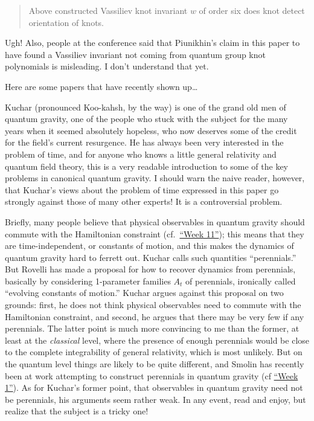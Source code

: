 \documentclass{article}
\def\tightlist{}
\renewcommand{\texttt}[1]{%
  \begingroup
  \ttfamily
  \begingroup\lccode`~=`/\lowercase{\endgroup\def~}{/\discretionary{}{}{}}%
  \begingroup\lccode`~=`[\lowercase{\endgroup\def~}{[\discretionary{}{}{}}%
  \begingroup\lccode`~=`.\lowercase{\endgroup\def~}{.\discretionary{}{}{}}%
  \catcode`/=\active\catcode`[=\active\catcode`.=\active
  \scantokens{#1\noexpand}%
  \endgroup
}
\begin{document}
\begin{quote}
Above constructed Vassiliev knot invariant \(w\) of order six does knot
detect orientation of knots.
\end{quote}
\noindent
Ugh! Also, people at the conference said that Piunikhin's claim in this
paper to have found a Vassiliev invariant not coming from quantum group
knot polynomials is misleading. I don't understand that yet.

Here are some papers that have recently shown up\ldots{}

\noindent
Kuchar (pronounced Koo-kahsh, by the way) is one of the grand old men of
quantum gravity, one of the people who stuck with the subject for the
many years when it seemed absolutely hopeless, who now deserves some of
the credit for the field's current resurgence. He has always been very
interested in the problem of time, and for anyone who knows a little
general relativity and quantum field theory, this is a very readable
introduction to some of the key problems in canonical quantum gravity. I
should warn the naive reader, however, that Kuchar's views about the
problem of time expressed in this paper go strongly against those of
many other experts! It is a controversial problem.

Briefly, many people believe that physical observables in quantum
gravity should commute with the Hamiltonian constraint (cf.\
\protect\hyperlink{week11}{``Week 11''}); this means that they are
time-independent, or constants of motion, and this makes the dynamics of
quantum gravity hard to ferrett out. Kuchar calls such quantities
``perennials.'' But Rovelli has made a proposal for how to recover
dynamics from perennials, basically by considering 1-parameter families
\(A_t\) of perennials, ironically called ``evolving constants of
motion.'' Kuchar argues against this proposal on two grounds: first, he
does not think physical observables need to commute with the Hamiltonian
constraint, and second, he argues that there may be very few if any
perennials. The latter point is much more convincing to me than the
former, at least at the \emph{classical} level, where the presence of
enough perennials would be close to the complete integrability of
general relativity, which is most unlikely. But on the quantum level
things are likely to be quite different, and Smolin has recently been at
work attempting to construct perennials in quantum gravity (cf
\protect\hyperlink{week1}{``Week 1''}). As for Kuchar's former point,
that observables in quantum gravity need not be perennials, his
arguments seem rather weak. In any event, read and enjoy, but realize
that the subject is a tricky one!
\end{document}
